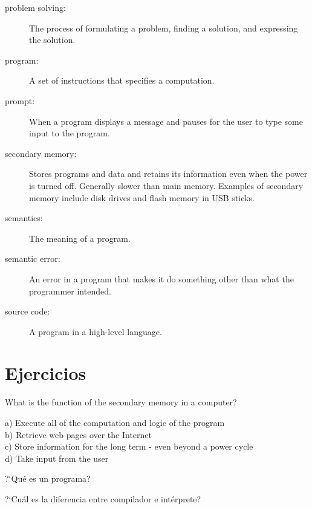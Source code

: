 \begin{description}
\item[problem solving:]  The process of formulating a problem, finding
a solution, and expressing the solution.

\item[program:] A set of instructions that specifies a computation.

\item[prompt:] When a program displays a message and pauses for the 
user to type some input to the program.

\item[secondary memory:] Stores programs and data and retains its 
information even when the power is turned off.  Generally slower 
than main memory.  Examples of secondary memory include disk 
drives and flash memory in USB sticks.

\item[semantics:]  The meaning of a program.

\item[semantic error:]   An error in a program that makes it do something
other than what the programmer intended.

\item[source code:]  A program in a high-level language.

\end{description}

\section{Ejercicios}


\begin{ex}
What is the function of the secondary memory in a computer?

a) Execute all of the computation and logic of the program\\
b) Retrieve web pages over the Internet\\
c) Store information for the long term - even beyond a power cycle\\
d) Take input from the user 
\end{ex}

\begin{ex}
?`Qu\'e es un programa?
\end{ex}

\begin{ex}
?`Cu\'al es la diferencia entre compilador e int\'erprete?
\end{ex}

